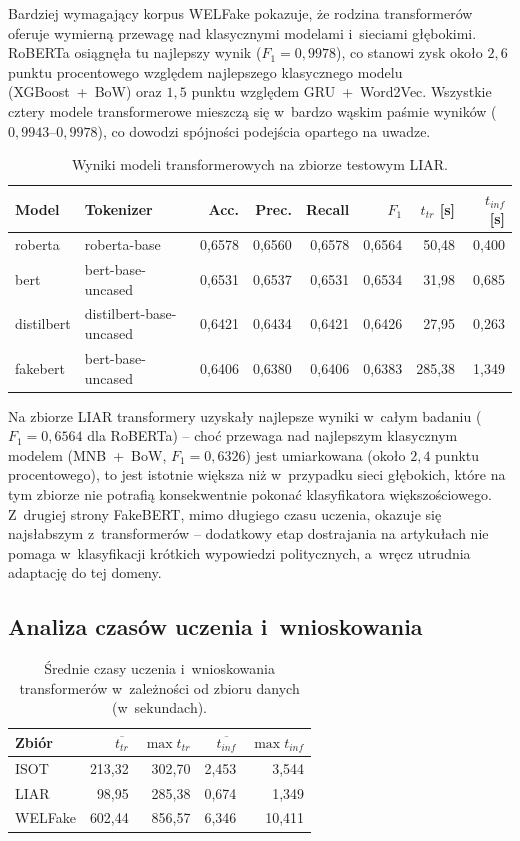 Bardziej wymagający korpus WELFake pokazuje, że rodzina transformerów
oferuje wymierną przewagę nad klasycznymi modelami i~sieciami
głębokimi. RoBERTa osiągnęła tu najlepszy wynik (\(F_1 = 0{,}9978\)),
co stanowi zysk około \(2{,}6\) punktu procentowego względem
najlepszego klasycznego modelu (XGBoost~+~BoW) oraz \(1{,}5\) punktu
względem GRU~+~Word2Vec. Wszystkie cztery modele transformerowe
mieszczą się w~bardzo wąskim paśmie wyników (\(0{,}9943\)--\(0{,}9978\)),
co dowodzi spójności podejścia opartego na uwadze.

\begin{table}[ht]
\centering
\caption{Wyniki modeli transformerowych na zbiorze testowym LIAR.}
\label{tab:bert_liar}
\begin{tabular}{llrrrrrr}
\toprule
Model & Tokenizer & Acc. & Prec. & Recall & $F_1$ & $t_{tr}$ [s] & $t_{inf}$ [s] \\
\midrule
roberta    & roberta-base            & 0,6578 & 0,6560 & 0,6578 & 0,6564 & 50,48  & 0,400 \\
bert       & bert-base-uncased       & 0,6531 & 0,6537 & 0,6531 & 0,6534 & 31,98  & 0,685 \\
distilbert & distilbert-base-uncased & 0,6421 & 0,6434 & 0,6421 & 0,6426 & 27,95  & 0,263 \\
fakebert   & bert-base-uncased       & 0,6406 & 0,6380 & 0,6406 & 0,6383 & 285,38 & 1,349 \\
\bottomrule
\end{tabular}
\end{table}

Na zbiorze LIAR transformery uzyskały najlepsze wyniki w~całym
badaniu (\(F_1 = 0{,}6564\) dla RoBERTa) -- choć przewaga nad
najlepszym klasycznym modelem (MNB~+~BoW, \(F_1 = 0{,}6326\)) jest
umiarkowana (około \(2{,}4\) punktu procentowego), to jest istotnie
większa niż w~przypadku sieci głębokich, które na tym zbiorze
nie potrafią konsekwentnie pokonać klasyfikatora większościowego.
Z~drugiej strony FakeBERT, mimo długiego czasu uczenia, okazuje się
najsłabszym z~transformerów -- dodatkowy etap dostrajania
na artykułach nie pomaga w~klasyfikacji krótkich wypowiedzi
politycznych, a~wręcz utrudnia adaptację do tej domeny.

\subsection{Analiza czasów uczenia i~wnioskowania}
\label{sec:wyniki_bert_czas}

\begin{table}[ht]
\centering
\caption{Średnie czasy uczenia i~wnioskowania transformerów
w~zależności od zbioru danych (w~sekundach).}
\label{tab:bert_czasy}
\begin{tabular}{lrrrr}
\toprule
Zbiór & $\overline{t_{tr}}$ & $\max{t_{tr}}$ & $\overline{t_{inf}}$ & $\max{t_{inf}}$ \\
\midrule
ISOT    & 213,32 & 302,70 & 2,453 & 3,544  \\
LIAR    &  98,95 & 285,38 & 0,674 & 1,349  \\
WELFake & 602,44 & 856,57 & 6,346 & 10,411 \\
\bottomrule
\end{tabular}
\end{table}

